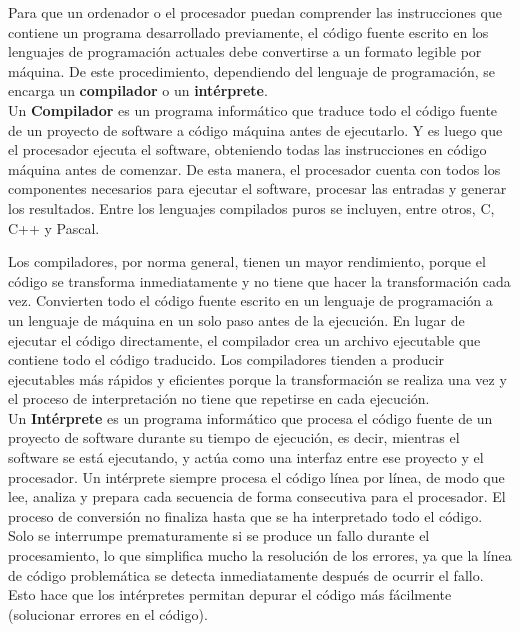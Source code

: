 
Para que un ordenador o el procesador puedan comprender las instrucciones que contiene un programa desarrollado previamente, el código fuente escrito en los lenguajes de programación actuales debe convertirse a un formato legible por máquina. De este procedimiento, dependiendo del lenguaje de programación, se encarga un {\bf{compilador}} o un {\bf{intérprete}}. \\




Un {\bf{Compilador}} es un programa informático que traduce todo el código fuente de un proyecto de software a código máquina antes de ejecutarlo. Y es luego que el procesador ejecuta el software, obteniendo todas las instrucciones en código máquina antes de comenzar. De esta manera, el procesador cuenta con todos los componentes necesarios para ejecutar el software, procesar las entradas y generar los resultados. 
Entre los lenguajes compilados puros se incluyen, entre otros,  C, C++ y Pascal.

Los compiladores, por norma general, tienen un mayor rendimiento, porque el código se transforma inmediatamente y no tiene que hacer la transformación cada vez. Convierten todo el código fuente escrito en un lenguaje de programación a un lenguaje de máquina en un solo paso antes de la ejecución. En lugar de ejecutar el código directamente, el compilador crea un archivo ejecutable que contiene todo el código traducido.  Los compiladores tienden a producir ejecutables más rápidos y eficientes porque la transformación se realiza una vez y el proceso de interpretación no tiene que repetirse en cada ejecución.\\

Un {\bf{Intérprete}} es un programa informático que procesa el código fuente de un proyecto de software durante su tiempo de ejecución, es decir, mientras el software se está ejecutando, y actúa como una interfaz entre ese proyecto y el procesador. Un intérprete siempre procesa el código línea por línea, de modo que lee, analiza y prepara cada secuencia de forma consecutiva para el procesador. El proceso de conversión no finaliza hasta que se ha interpretado todo el código. Solo se interrumpe prematuramente si se produce un fallo durante el procesamiento, lo que simplifica mucho la resolución de los errores, ya que la línea de código problemática se detecta inmediatamente después de ocurrir el fallo. Esto hace que los intérpretes permitan depurar  el código más fácilmente (solucionar errores en el código).


